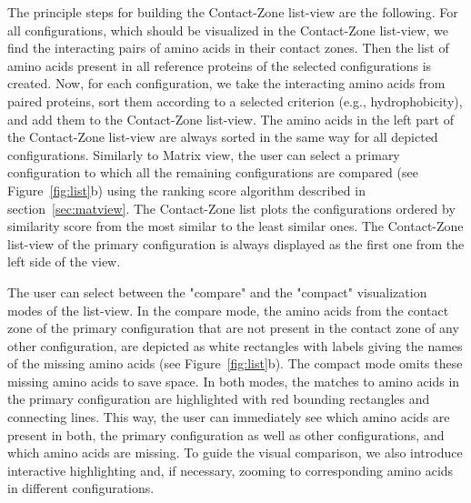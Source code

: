 \documentclass{bmcart}
\def\MatView {Matrix view\xspace}
\def\CoZoListView {Contact-Zone list-view\xspace}
\def\CoZoList{Contact-Zone list\xspace}
\begin{document}
The principle steps for building the \CoZoListView are the following.
For all configurations, which should be visualized in the \CoZoListView, we find the interacting pairs of amino acids in their contact zones.
Then the list of amino acids present in all reference proteins of the selected configurations is created.
Now, for each configuration, we take the interacting amino acids from paired proteins, sort them according to a selected criterion (e.g., hydrophobicity), and add them to the \CoZoListView.
The amino acids in the left part of the \CoZoListView are always sorted in the same way for all depicted configurations.
Similarly to \MatView, the user can select a primary configuration to which all the remaining configurations are compared (see Figure~\ref{fig:list}b) using the ranking score algorithm described in section~\ref{sec:matview}.
The \CoZoList plots the configurations ordered by similarity score from the most similar to the least similar ones.
The \CoZoListView of the primary configuration is always displayed as the first one from the left side of the view.

The user can select between the "compare" and the "compact" visualization modes of the list-view.
In the compare mode, the amino acids from the contact zone of the primary configuration that are not present in the contact zone of any other configuration, are depicted as white rectangles with labels giving the names of the missing amino acids (see Figure~\ref{fig:list}b).
The compact mode omits these missing amino acids to save space.
In both modes, the matches to amino acids in the primary configuration are highlighted with red bounding rectangles and connecting lines.
This way, the user can immediately see which amino acids are present in both, the primary configuration as well as other configurations, and which amino acids are missing.
To guide the visual comparison, we also introduce interactive highlighting and, if necessary, zooming to corresponding amino acids in different configurations.

\end{document}
